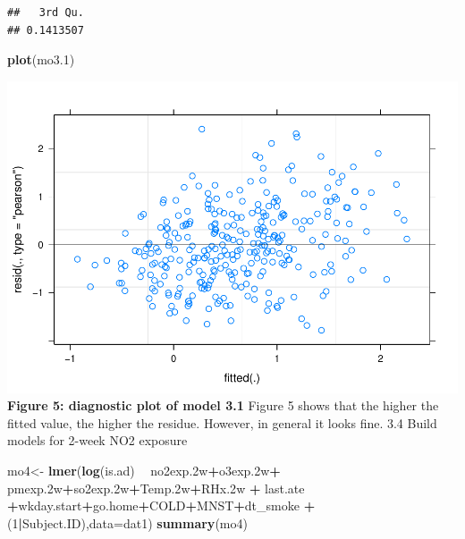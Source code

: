 \documentclass[12pt,]{article}
\newenvironment{Shaded}{\begin{snugshade}}{\end{snugshade}}
\newcommand{\DataTypeTok}[1]{\textcolor[rgb]{0.13,0.29,0.53}{#1}}
\newcommand{\DecValTok}[1]{\textcolor[rgb]{0.00,0.00,0.81}{#1}}
\newcommand{\FloatTok}[1]{\textcolor[rgb]{0.00,0.00,0.81}{#1}}
\newcommand{\KeywordTok}[1]{\textcolor[rgb]{0.13,0.29,0.53}{\textbf{#1}}}
\newcommand{\NormalTok}[1]{#1}
\newcommand{\OperatorTok}[1]{\textcolor[rgb]{0.81,0.36,0.00}{\textbf{#1}}}
\newcommand{\StringTok}[1]{\textcolor[rgb]{0.31,0.60,0.02}{#1}}
\begin{document}
\begin{verbatim}
##   3rd Qu. 
## 0.1413507
\end{verbatim}

\begin{Shaded}
\begin{Highlighting}[]
\KeywordTok{plot}\NormalTok{(mo3}\FloatTok{.1}\NormalTok{)}
\end{Highlighting}
\end{Shaded}

\includegraphics{872_files/figure-latex/unnamed-chunk-6-1.pdf}
\center \textbf{Figure 5: diagnostic plot of model 3.1} \center Figure 5
shows that the higher the fitted value, the higher the residue. However,
in general it looks fine. 3.4 Build models for 2-week NO2 exposure

\begin{Shaded}
\begin{Highlighting}[]
\NormalTok{mo4<-}\StringTok{ }\KeywordTok{lmer}\NormalTok{(}\KeywordTok{log}\NormalTok{(is.ad) }\OperatorTok{~}\StringTok{ }\NormalTok{no2exp}\FloatTok{.2}\NormalTok{w}\OperatorTok{+}\NormalTok{o3exp}\FloatTok{.2}\NormalTok{w}\OperatorTok{+}\StringTok{ }\NormalTok{pmexp}\FloatTok{.2}\NormalTok{w}\OperatorTok{+}\NormalTok{so2exp}\FloatTok{.2}\NormalTok{w}\OperatorTok{+}\NormalTok{Temp}\FloatTok{.2}\NormalTok{w}\OperatorTok{+}\NormalTok{RHx}\FloatTok{.2}\NormalTok{w }\OperatorTok{+}\StringTok{ }\NormalTok{last.ate }\OperatorTok{+}\NormalTok{wkday.start}\OperatorTok{+}\NormalTok{go.home}\OperatorTok{+}\NormalTok{COLD}\OperatorTok{+}\NormalTok{MNST}\OperatorTok{+}\NormalTok{dt_smoke }\OperatorTok{+}\NormalTok{(}\DecValTok{1}\OperatorTok{|}\NormalTok{Subject.ID),}\DataTypeTok{data=}\NormalTok{dat1)}
\KeywordTok{summary}\NormalTok{(mo4)}
\end{Highlighting}
\end{Shaded}
\end{document}
